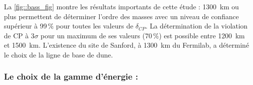         La \autoref{fig::bass_fig} montre les résultats importants de cette étude : \SI{1300}{\kilo\meter} ou plus permettent de déterminer l'ordre des masses avec un niveau de confiance supérieur à 99\,\% pour toutes les valeurs de $\delta_{CP}$. La détermination de la violation de CP à $3\sigma$ pour un maximum de ses valeurs (70\,\%) est possible entre \SI{1200}{\kilo\meter} et \SI{1500}{\kilo\meter}. L'existence du site de Sanford, à \SI{1300}{\kilo\meter} du Fermilab, a déterminé le choix de la ligne de base de \gls{dune}.
        
      \subsubsection{Le choix de la gamme d'énergie :}

